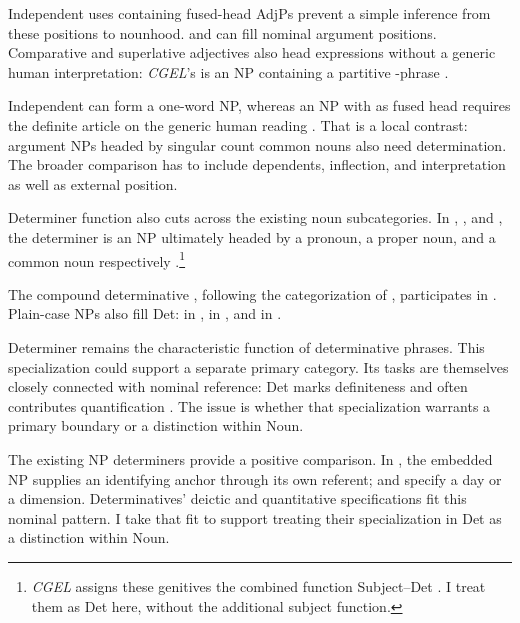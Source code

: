 \documentclass[12pt]{article}
\begin{document}
Independent uses containing fused-head AdjPs prevent a simple inference from these positions to nounhood.  and  can fill nominal argument positions. Comparative and superlative adjectives also head expressions without a generic human interpretation: \textit{CGEL}'s  is an NP containing a partitive -phrase \citep[332--333, 416--423]{huddleston2002}.

Independent  can form a one-word NP, whereas an NP with  as fused head requires the definite article  on the generic human reading \citep[417--418]{huddleston2002}. That is a local contrast: argument NPs headed by singular count common nouns also need determination. The broader comparison has to include dependents, inflection, and interpretation as well as external position.

Determiner function also cuts across the existing noun subcategories. In , , and , the determiner is an NP ultimately headed by a pronoun, a proper noun, and a common noun respectively \citep[354--355, 470--471]{huddleston2002}.\footnote{\textit{CGEL} assigns these genitives the combined function Subject--Det \citep[472--473]{huddleston2002}. I treat them as Det here, without the additional subject function.}

The compound determinative , following the categorization of \textcite[§1.3]{Payne2007}, participates in . Plain-case NPs also fill Det:  in ,  in , and  in  \citep[356]{huddleston2002}.

Determiner remains the characteristic function of determinative phrases. This specialization could support a separate primary category. Its tasks are themselves closely connected with nominal reference: Det marks definiteness and often contributes quantification \citep[354--359]{huddleston2002}. The issue is whether that specialization warrants a primary boundary or a distinction within Noun.

The existing NP determiners provide a positive comparison. In , the embedded NP supplies an identifying anchor through its own referent;  and  specify a day or a dimension. Determinatives' deictic and quantitative specifications fit this nominal pattern. I take that fit to support treating their specialization in Det as a distinction within Noun.
\end{document}
